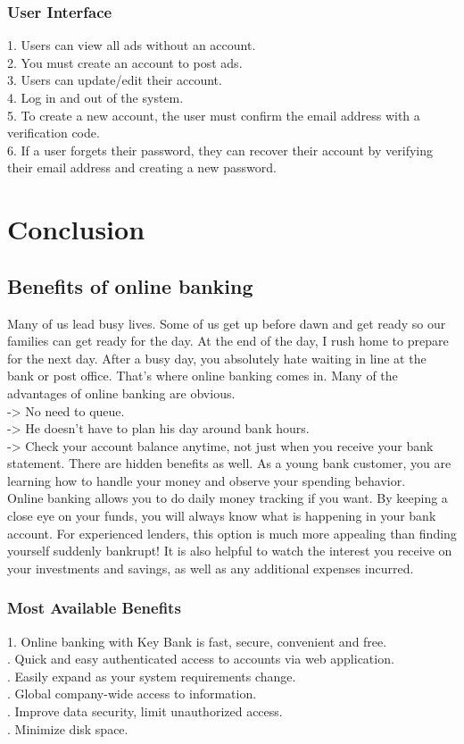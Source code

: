 \documentclass{article}
\begin{document}
\subsubsection{User Interface}
1. Users can view all ads without an account.\\
2. You must create an account to post ads.\\
3. Users can update/edit their account. \\4. Log in and out of the system.\\
5. To create a new account, the user must confirm the email address with a verification code.\\
6. If a user forgets their password, they can recover their account by verifying their email address and creating a new password.
\newpage
\section{Conclusion}
\subsection{Benefits of online banking}
Many of us lead busy lives. Some of us get up before dawn and get ready so our families can get ready for the day. At the end of the day, I rush home to prepare for the next day. After a busy day, you absolutely hate waiting in line at the bank or post office. That's where online banking comes in. Many of the advantages of online banking are obvious.\\ \hfill \break
-> No need to queue. \\ \hfill \break-> He doesn't have to plan his day around bank hours. \\ \hfill \break -> Check your account balance anytime, not just when you receive your bank statement. There are hidden benefits as well. As a young bank customer, you are learning how to handle your money and observe your spending behavior. \\ \hfill \break Online banking allows you to do daily money tracking if you want. By keeping a close eye on your funds, you will always know what is happening in your bank account. For experienced lenders, this option is much more appealing than finding yourself suddenly bankrupt! It is also helpful to watch the interest you receive on your investments and savings, as well as any additional expenses incurred. 
\subsubsection{Most Available Benefits}
1. Online banking with Key Bank is fast, secure, convenient and free.\\ \hfill {}. Quick and easy authenticated access to accounts via web application.\\ \hfill {}. Easily expand as your system requirements change.\\ \hfill {}. Global company-wide access to information.\\ \hfill {}. Improve data security, limit unauthorized access.\\ \hfill {}. Minimize disk space.
\end{document}
